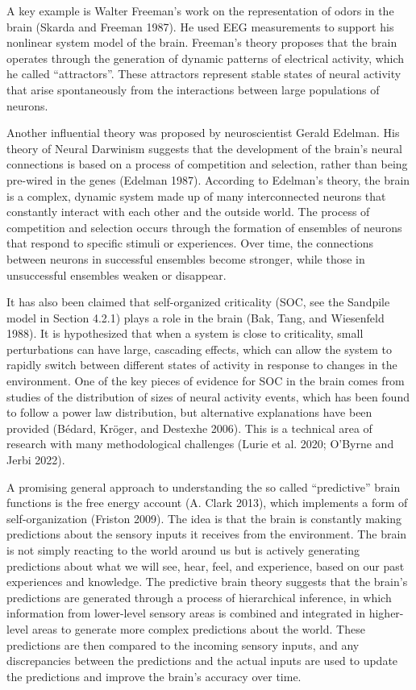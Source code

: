 \documentclass[
  letterpaper,
]{scrbook}
\begin{document}
A key example is Walter Freeman's work on the representation of odors in
the brain (Skarda and Freeman 1987). He used EEG measurements to support
his nonlinear system model of the brain. Freeman's theory proposes that
the brain operates through the generation of dynamic patterns of
electrical activity, which he called ``attractors''. These attractors
represent stable states of neural activity that arise spontaneously from
the interactions between large populations of neurons.

Another influential theory was proposed by neuroscientist Gerald
Edelman. His theory of Neural Darwinism suggests that the development of
the brain's neural connections is based on a process of competition and
selection, rather than being pre-wired in the genes (Edelman 1987).
According to Edelman's theory, the brain is a complex, dynamic system
made up of many interconnected neurons that constantly interact with
each other and the outside world. The process of competition and
selection occurs through the formation of ensembles of neurons that
respond to specific stimuli or experiences. Over time, the connections
between neurons in successful ensembles become stronger, while those in
unsuccessful ensembles weaken or disappear.

It has also been claimed that self-organized criticality (SOC, see the
Sandpile model in Section 4.2.1) plays a role in the brain (Bak, Tang,
and Wiesenfeld 1988). It is hypothesized that when a system is close to
criticality, small perturbations can have large, cascading effects,
which can allow the system to rapidly switch between different states of
activity in response to changes in the environment. One of the key
pieces of evidence for SOC in the brain comes from studies of the
distribution of sizes of neural activity events, which has been found to
follow a power law distribution, but alternative explanations have been
provided (Bédard, Kröger, and Destexhe 2006). This is a technical area
of research with many methodological challenges (Lurie et al. 2020;
O'Byrne and Jerbi 2022).

A promising general approach to understanding the so called
``predictive'' brain functions is the free energy account (A. Clark
2013), which implements a form of self-organization (Friston 2009). The
idea is that the brain is constantly making predictions about the
sensory inputs it receives from the environment. The brain is not simply
reacting to the world around us but is actively generating predictions
about what we will see, hear, feel, and experience, based on our past
experiences and knowledge. The predictive brain theory suggests that the
brain's predictions are generated through a process of hierarchical
inference, in which information from lower-level sensory areas is
combined and integrated in higher-level areas to generate more complex
predictions about the world. These predictions are then compared to the
incoming sensory inputs, and any discrepancies between the predictions
and the actual inputs are used to update the predictions and improve the
brain's accuracy over time.
\end{document}
